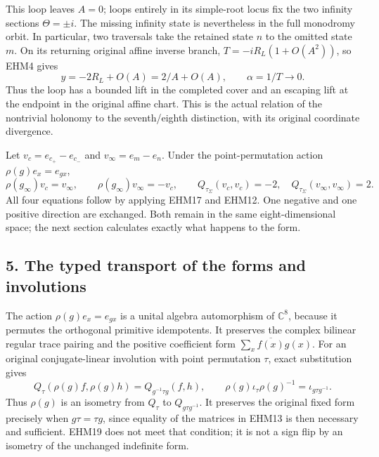 \documentclass[
  10pt,
  a4paper,
]{article}
\begin{document}
This loop leaves \(A=0\); loops entirely in its simple-root locus fix
the two infinity sections \(\Theta=\pm i\). The missing infinity state
is nevertheless in the full monodromy orbit. In particular, two
traversals take the retained state \(n\) to the omitted state \(m\). On
its returning original affine inverse branch, \(T=-iR_L(1+O(A^2))\), so
EHM4 gives \[
y=-2R_L+O(A)=2/A+O(A),\qquad\alpha=1/T\longrightarrow0.
\tag{EHM18}
\] Thus the loop has a bounded lift in the completed cover and an
escaping lift at the endpoint in the original affine chart. This is the
actual relation of the nontrivial holonomy to the seventh/eighth
distinction, with its original coordinate divergence.

Let \(v_c=e_{c_+}-e_{c_-}\) and \(v_\infty=e_m-e_n\). Under the
point-permutation action \(\rho(g)e_x=e_{gx}\), \[
\rho(g_\infty)v_c=v_\infty,\qquad
\rho(g_\infty)v_\infty=-v_c,
\qquad Q_{\tau_\Sigma}(v_c,v_c)=-2,
\quad Q_{\tau_\Sigma}(v_\infty,v_\infty)=2.
\tag{EHM19}
\] All four equations follow by applying EHM17 and EHM12. One negative
and one positive direction are exchanged. Both remain in the same
eight-dimensional space; the next section calculates exactly what
happens to the form.

\subsection{5. The typed transport of the forms and
involutions}\label{the-typed-transport-of-the-forms-and-involutions}

The action \(\rho(g)e_x=e_{gx}\) is a unital algebra automorphism of
\(\mathbb C^8\), because it permutes the orthogonal primitive
idempotents. It preserves the complex bilinear regular trace pairing and
the positive coefficient form \(\sum_x\overline{f(x)}g(x)\). For an
original conjugate-linear involution with point permutation \(\tau\),
exact substitution gives \[
Q_\tau(\rho(g)f,\rho(g)h)=Q_{g^{-1}\tau g}(f,h),\qquad
\rho(g)\iota_\tau\rho(g)^{-1}=\iota_{g\tau g^{-1}}.
\tag{EHM20}
\] Thus \(\rho(g)\) is an isometry from \(Q_\tau\) to
\(Q_{g\tau g^{-1}}\). It preserves the original fixed form precisely
when \(g\tau=\tau g\), since equality of the matrices in EHM13 is then
necessary and sufficient. EHM19 does not meet that condition; it is not
a sign flip by an isometry of the unchanged indefinite form.
\end{document}

